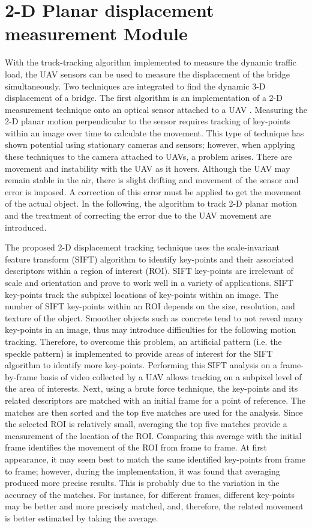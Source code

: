 \documentclass{sigchi}
\begin{document}
\section{2-D Planar displacement measurement Module}

With the truck-tracking algorithm implemented to measure the dynamic traffic load, the UAV sensors can be used to measure the displacement of the bridge simultaneously. Two techniques are integrated to find the dynamic 3-D displacement of a bridge. The first algorithm is an implementation of a 2-D measurement technique onto an optical sensor attached to a UAV \cite{Kalaitzakis2019,Catt2019Development}. Measuring the 2-D planar motion perpendicular to the sensor requires tracking of key-points within an image over time to calculate the movement. This type of technique has shown potential using stationary cameras and sensors; however, when applying these techniques to the camera attached to UAVs, a problem arises. There are movement and instability with the UAV as it hovers. Although the UAV may remain stable in the air, there is slight drifting and movement of the sensor and error is imposed. A correction of this error must be applied to get the movement of the actual object. In the following, the algorithm to track 2-D planar motion and the treatment of correcting the error due to the UAV movement are introduced.

The proposed 2-D displacement tracking technique uses the scale-invariant feature transform (SIFT) algorithm to identify key-points and their associated descriptors within a region of interest (ROI)\cite{Lowe1999}. SIFT key-points are irrelevant of scale and orientation and prove to work well in a variety of applications. SIFT key-points track the subpixel locations of key-points within an image. The number of SIFT key-points within an ROI depends on the size, resolution, and texture of the object. Smoother objects such as concrete tend to not reveal many key-points in an image, thus may introduce difficulties for the following motion tracking. Therefore, to overcome this problem, an artificial pattern (i.e. the speckle pattern) is implemented to provide areas of interest for the SIFT algorithm to identify more key-points. Performing this SIFT analysis on a frame-by-frame basis of video collected by a UAV allows tracking on a subpixel level of the area of interests. Next, using a brute force technique, the key-points and its related descriptors are matched with an initial frame for a point of reference. The matches are then sorted and the top five matches are used for the analysis. Since the selected ROI is relatively small, averaging the top five matches provide a measurement of the location of the ROI. Comparing this average with the initial frame identifies the movement of the ROI from frame to frame. At first appearance, it may seem best to match the same identified key-points from frame to frame; however, during the implementation, it was found that averaging produced more precise results. This is probably due to the variation in the accuracy of the matches. For instance, for different frames, different key-points may be better and more precisely matched, and, therefore, the related movement is better estimated by taking the average.
\end{document}
